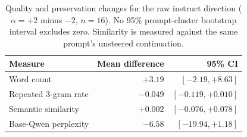 \begin{table}[t]
\centering
\caption{Quality and preservation changes for the raw instruct direction ($\alpha=+2$ minus $-2$, $n=16$). No 95\% prompt-cluster bootstrap interval excludes zero. Similarity is measured against the same prompt's unsteered continuation.}
\label{tab:quality}
\begin{tabular}{@{}lrr@{}}
\toprule
\textbf{Measure} & \textbf{Mean difference} & \textbf{95\% CI} \\
\midrule
Word count & $+3.19$ & $[-2.19,+8.63]$ \\
Repeated 3-gram rate & $-0.049$ & $[-0.119,+0.010]$ \\
Semantic similarity & $+0.002$ & $[-0.076,+0.078]$ \\
Base-Qwen perplexity & $-6.58$ & $[-19.94,+1.18]$ \\
\bottomrule
\end{tabular}
\end{table}

